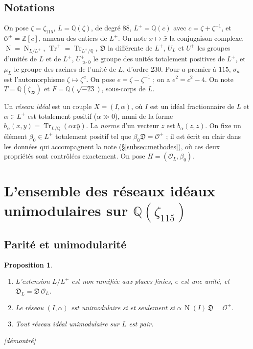 \documentclass[11pt,a4paper]{amsart}
\theoremstyle{plain}
\newtheorem{proposition}[theoreme]{Proposition}
\theoremstyle{definition}
\numberwithin{equation}{section}
\newcommand{\Q}{\mathbb{Q}}
\newcommand{\Z}{\mathbb{Z}}
\newcommand{\OO}{\mathcal{O}}
\newcommand{\Op}{\mathcal{O}^{+}}
\newcommand{\Dif}{\mathfrak{D}}
\DeclareMathOperator{\Tr}{Tr}
\DeclareMathOperator{\Nm}{N}
\newcommand{\Up}{U^{+}}
\newcommand{\Upp}{U^{+}_{\gg0}}
\newcommand{\Trp}{\Tr^{+}}
\newcommand{\st}[1]{\textup{\textsf{\small[#1]}}}
\newcommand{\DEM}{\st{démontré}}
\begin{document}
\subsection*{Notations}
On pose $\zeta=\zeta_{115}$, $L=\Q(\zeta)$, de degré $88$, $L^+=\Q(c)$ avec $c=\zeta+\zeta^{-1}$, et $\Op=\Z[c]$, anneau des entiers de $L^+$. On note $x\mapsto\bar x$ la conjugaison complexe, $\Nm=\Nm_{L/L^+}$, $\Trp=\Tr_{L^+/\Q}$, $\Dif$ la différente de $L^+$, $U_L$ et $\Up$ les groupes d'unités de $L$ et de $L^+$, $\Upp$ le groupe des unités totalement positives de $L^+$, et $\mu_L$ le groupe des racines de l'unité de $L$, d'ordre $230$. Pour $a$ premier à $115$, $\sigma_a$ est l'automorphisme $\zeta\mapsto\zeta^a$. On pose $e=\zeta-\zeta^{-1}$ ; on a $e^2=c^2-4$. On note $T=\Q(\zeta_{23})$ et $F=\Q(\sqrt{-23})$, sous-corps de $L$.

Un \emph{réseau idéal} est un couple $X=(I,\alpha)$, où $I$ est un idéal fractionnaire de $L$ et $\alpha\in L^+$ est totalement positif ($\alpha\gg0$), muni de la forme $b_\alpha(x,y)=\Tr_{L/\Q}(\alpha x\bar y)$. La \emph{norme} d'un vecteur $z$ est $b_\alpha(z,z)$. On fixe un élément $\beta_0\in L^+$ totalement positif tel que $\beta_0\Dif=\Op$ ; il est écrit en clair dans les données qui accompagnent la note (\S\ref{subsec:methodes}), où ces deux propriétés sont contrôlées exactement. On pose $H=(\OO_L,\beta_0)$.

\section{L'ensemble des réseaux idéaux unimodulaires sur \texorpdfstring{$\Q(\zeta_{115})$}{Q(zeta115)}}\label{sec:S}

\subsection{Parité et unimodularité}

\begin{proposition}\label{prop:pair}
\begin{enumerate}[label=\textup{(\alph*)}]
\item L'extension $L/L^+$ est non ramifiée aux places finies, $e$ est une unité, et $\Dif_L=\Dif\,\OO_L$.
\item Le réseau $(I,\alpha)$ est unimodulaire si et seulement si $\alpha\,\Nm(I)\,\Dif=\Op$.
\item Tout réseau idéal unimodulaire sur $L$ est pair.
\end{enumerate}
\DEM
\end{proposition}
\end{document}
